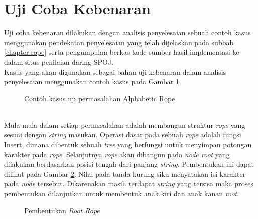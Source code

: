 \section{Uji Coba Kebenaran}
\label{section:ujikebenaran}
Uji coba kebenaran dilakukan dengan analisis penyelesaian sebuah contoh kasus menggunakan pendekatan penyelesaian yang telah dijelaskan pada subbab \ref{chapter:rope} serta pengumpulan berkas kode sumber hasil implementasi ke dalam situs penilaian daring SPOJ.\\
Kasus yang akan digunakan sebagai bahan uji kebenaran dalam analisis penyelesaian \problem{} menggunakan contoh kasus pada Gambar \ref{figure:sample_problem}.
\begin{figure}[h]
	\caption{Contoh kasus uji permasalahan Alphabetic Rope}
	\label{figure:sample_problem}
\end{figure}\\
Mula-mula dalam setiap permasalahan adalah membangun struktur \textit{rope} yang sesuai dengan \textit{string} masukan. Operasi dasar pada sebuah \textit{rope} adalah fungsi Insert, dimana dibentuk sebuah \textit{tree} yang berfungsi untuk menyimpan potongan karakter pada \textit{rope}. Selanjutnya \textit{rope} akan dibangun pada \textit{node root} yang dilakukan berdasarkan posisi tengah dari panjang \textit{string}. Pembentukan ini dapat dilihat pada Gambar \ref{fig:build_root}. Nilai pada tanda kurung siku menyatakan isi karakter pada \textit{node} tersebut. Dikarenakan masih terdapat \textit{string} yang tersisa maka proses pembentukan dilanjutkan untuk membentuk anak kiri dan anak kanan \textit{root}.
\begin{figure}[h]
\centering
{}
\caption{Pembentukan \textit{Root Rope} \label{fig:build_root}}
\end{figure}
